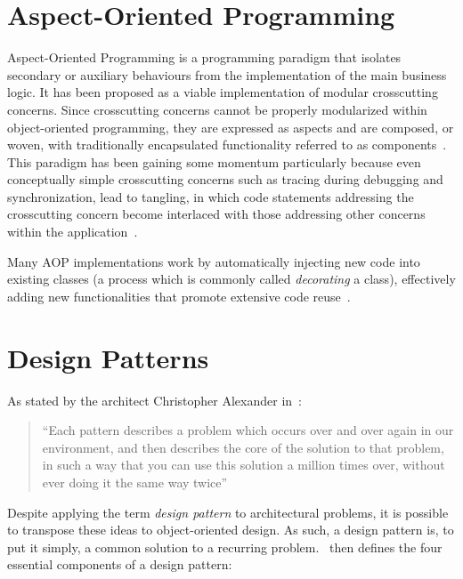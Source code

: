 \section{Aspect-Oriented Programming}\label{sec:aspect_oriented_programming}

Aspect-Oriented Programming is a programming paradigm that isolates secondary or auxiliary behaviours from the implementation of the main business logic. It has been proposed as a viable implementation of modular crosscutting concerns. Since crosscutting concerns cannot be properly modularized within object-oriented programming, they are expressed as aspects and are composed, or woven, with traditionally encapsulated functionality referred to as components~\cite{KM05, Ste06}. This paradigm has been gaining some momentum particularly because even conceptually simple crosscutting concerns such as tracing during debugging and synchronization, lead to tangling, in which code statements addressing the crosscutting concern become interlaced with those addressing other concerns within the application~\cite{LC03}.

Many AOP implementations work by automatically injecting new code into existing classes (a process which is commonly called \emph{decorating} a class), effectively adding new functionalities that promote extensive code reuse~\cite{Ste06, LC03, metaclass_programming_in_python}.

\section{Design Patterns}\label{sec:design_patterns}

As stated by the architect Christopher Alexander in~\cite{christopher_alexander_a_pattern_language}:

\begin{quote}
  ``Each pattern describes a problem which occurs over and over again in our environment, and then describes the core of the solution to that problem, in such a way that you can use this solution a million times over, without ever doing it the same way twice''
\end{quote}

Despite applying the term \emph{design pattern} to architectural problems, it is possible to transpose these ideas to object-oriented design. As such, a design pattern is, to put it simply, a common solution to a recurring problem.~\cite{gang_of_four} then defines the four essential components of a design pattern:

